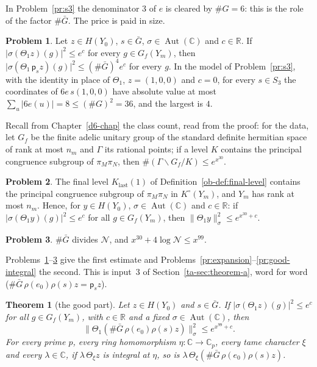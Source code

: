 \documentclass[reqno]{amsart}
\newcounter{chap}
\theoremstyle{definition}
\newtheorem{problem}{Problem}[section]
\theoremstyle{plain}
\newtheorem{theorem}{Theorem}[section]
\theoremstyle{definition}
\newcommand{\R}{\mathbb{R}}
\newcommand{\C}{\mathbb{C}}
\newcommand{\Gb}{\bar G}
\newcommand{\Aut}{\operatorname{Aut}}
\newcommand{\ps}{\mathsf p_s}
\newcommand{\Nc}{\mathcal N}
\begin{document}
In Problem~\ref{pr:s3} the denominator \(3\) of \(e\) is cleared by \(\#G = 6\): this is the role of the factor \(\#\Gb\).  The price is paid in size.

\begin{problem}\label{pr:pointwise}
Let \(z \in H(Y_0)\), \(s \in \Gb\), \(\sigma \in \Aut(\C)\) and \(c \in \R\).  If \(\lvert\sigma(\Theta_1 z)(g)\rvert^2 \le e^c\) for every \(g \in G_f(Y_m)\), then \(\lvert\sigma(\Theta_1\,\ps z)(g)\rvert^2 \le (\#\Gb)^4e^c\) for every \(g\).  In the model of Problem~\ref{pr:s3}, with the identity in place of \(\Theta_1\), \(z = (1, 0, 0)\) and \(c = 0\), for every \(s \in S_3\) the coordinates of \(6e\,s(1, 0, 0)\) have absolute value at most \(\sum_u \lvert 6e(u)\rvert = 8 \le (\#G)^2 = 36\), and the largest is \(4\).
\end{problem}

Recall from Chapter~\ref{d6-chap} the class count, read from the proof: for the data, let \(G_f\) be the finite adelic unitary group of the standard definite hermitian space of rank at most \(n_m\) and \(\Gamma\) its rational points; if a level \(K\) contains the principal congruence subgroup of \(\pi_M\pi_N\), then \(\#(\Gamma\backslash G_f/K) \le e^{x^{30}}\).

\begin{problem}\label{pr:count}
The final level \(K_{\mathrm{last}}(1)\) of Definition~\ref{ob-def:final-level} contains the principal congruence subgroup of \(\pi_M\pi_N\) in \(K^\circ(Y_m)\), and \(Y_m\) has rank at most \(n_m\).  Hence, for \(y \in H(Y_0)\), \(\sigma \in \Aut(\C)\) and \(c \in \R\): if \(\lvert\sigma(\Theta_1 y)(g)\rvert^2 \le e^c\) for all \(g \in G_f(Y_m)\), then \(\lVert\Theta_1 y\rVert_\sigma^2 \le e^{x^{30} + c}\).
\end{problem}

\begin{problem}\label{pr:group-size}
\(\#\Gb\) divides \(\Nc\), and \(x^{30} + 4\log\Nc \le x^{99}\).
\end{problem}

Problems~\ref{pr:pointwise}--\ref{pr:group-size} give the first estimate and Problems~\ref{pr:expansion}--\ref{pr:good-integral} the second.  This is input~3 of Section~\ref{ta-sec:theorem-a}, word for word (\(\#\Gb\,\rho(e_0)\rho(s)z = \ps z\)).

\begin{theorem}[the good part]\label{thm:good-part}
Let \(z \in H(Y_0)\) and \(s \in \Gb\).  If \(\lvert\sigma(\Theta_1 z)(g)\rvert^2 \le e^c\) for all \(g \in G_f(Y_m)\), with \(c \in \R\) and a fixed \(\sigma \in \Aut(\C)\), then
\[
  \lVert\Theta_1(\#\Gb\,\rho(e_0)\rho(s)z)\rVert_\sigma^2 \le e^{x^{99} + c}.
\]
For every prime \(p\), every ring homomorphism \(\eta\colon \C \to \C_p\), every tame character \(\xi\) and every \(\lambda \in \C\), if \(\lambda\,\Theta_\xi z\) is integral at \(\eta\), so is \(\lambda\,\Theta_\xi(\#\Gb\,\rho(e_0)\rho(s)z)\).
\end{theorem}
\end{document}
